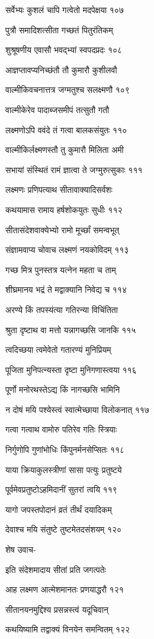 सर्वेभ्यः कुशलं चापि गत्वेतो मदपेक्षया १०७

पुत्रौ समादिशत्सीता गच्छतं पितुरंतिकम्

शुश्रूषणीय एवासौ भवद्भ्यां स्वपदप्रदः १०८

आज्ञप्तावप्यनिच्छंतौ तौ कुमारौ कुशीलवौ

वाल्मीकिवचनात्तत्र जग्मतुश्च सलक्ष्मणौ १०९

वाल्मीकेरेव पादाब्जसमीपं तत्सुतौ गतौ

लक्ष्मणोऽपि ववंदे तं गत्वा बालकसंयुतः ११०

वाल्मीकिर्लक्ष्मणस्तौ तु कुमारौ मिलिता अमी

सभायां संस्थितं रामं ज्ञात्वा ते जग्मुरुत्सुकाः १११

लक्ष्मणः प्रणिपत्याथ सीतावाक्यादिसर्वशः

कथयामास रामाय हर्षशोकयुतः सुधीः ११२

सीतासंदेशवाक्येभ्यो रामो मूर्च्छां समन्वभूत्

संज्ञामवाप्य चोवाच लक्ष्मणं नयकोविदम् ११३

गच्छ मित्र पुनस्तत्र यत्नेन महता च ताम्

शीघ्रमानय भद्रं ते मद्वाक्यानि निवेद्य च ११४

अरण्ये किं तपस्यंत्या गतिरन्या विचिंतिता

श्रुता दृष्टाथ वा मत्तो यन्नागच्छसि जानकि ११५

त्वदिच्छया त्वमेवेतो गतारण्यं मुनिप्रियम्

पूजिता मुनिपत्न्यस्ता दृष्टा मुनिगणास्त्वया ११६

पूर्णो मनोरथस्तेऽद्य किं नागच्छसि भामिनि

न दोषं मयि पश्येस्त्वं स्वात्मेच्छाया विलोकनात् ११७

गत्वा गत्वाथ वामोरु पतिरेव गतिः स्त्रियाः

निर्गुणोपि गुणांभोधिः किंपुनर्मनसेप्सितः ११८

याया क्रियाकुलस्त्रीणां सासा पत्युः प्रतुष्टये

पूर्वमेवप्रतुष्टोऽहमिदानीं सुतरां त्वयि ११९

यागो जपस्तपोदानं व्रतं तीर्थं दयादिकम्

देवाश्च मयि संतुष्टे तुष्टमेतदसंशयम् १२०

शेष उवाच-

इति संदेशमादाय सीतां प्रति जगत्पतेः

आह लक्ष्मण आत्मेशमानतः प्रणयाद्धरौ १२१

सीतानयनमुद्दिश्य प्रसन्नस्त्वं यदूचिवान्

कथयिष्यामि तद्वाक्यं विनयेन समन्वितम् १२२

